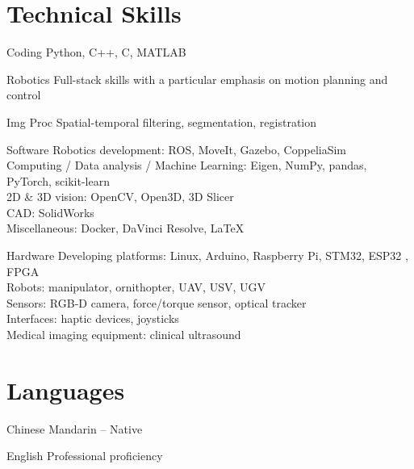 \documentclass[11pt,letterpaper]{report}
\begin{document}
\section*{Technical Skills}
\begin{tablist}
	\item[Coding] \tab Python, C++, C, MATLAB
	\item[Robotics] \tab Full-stack skills with a particular emphasis on motion planning and control
	\item [Img Proc] \tab Spatial-temporal filtering, segmentation, registration
	\item[Software] \tab Robotics development: ROS, MoveIt, Gazebo, CoppeliaSim\\
	Computing / Data analysis / Machine Learning: Eigen, NumPy, pandas, PyTorch, scikit-learn\\
	2D \& 3D vision: OpenCV, Open3D, 3D Slicer\\
	CAD: SolidWorks\\
	Miscellaneous: Docker, DaVinci Resolve, \LaTeX
	\item[Hardware] \tab Developing platforms: Linux, Arduino, Raspberry Pi, STM32, ESP32	, FPGA\\
	Robots: manipulator, ornithopter, UAV, USV, UGV\\ 
	Sensors: RGB-D camera, force/torque sensor, optical tracker\\
	Interfaces: haptic devices, joysticks\\
	Medical imaging equipment: clinical ultrasound
\end{tablist}


\section*{Languages}
\begin{tablist}
	\item[Chinese] \tab Mandarin -- Native
	\item[English] \tab Professional proficiency
\end{tablist}
\newpage
\end{document}
